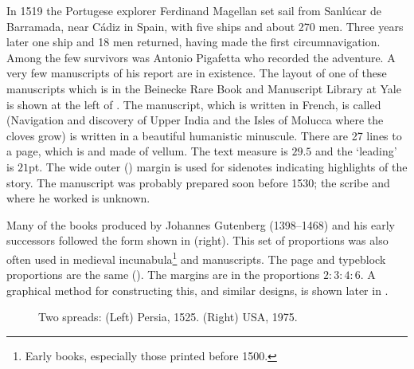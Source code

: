 \documentclass[10pt,a4paper,extrafontsizes]{memoir}
\begin{document}
\begin{paracol}{2}
\switchEng
    In 1519 the Portugese explorer Ferdinand Magellan set sail from 
Sanl\'{u}car de Barramada, near C\'{a}diz in Spain, 
with five ships and about 270 men.
Three years later one ship and 18 men returned, having made the first
circumnavigation. Among the few survivors was Antonio Pigafetta who recorded
the adventure. 
A very few manuscripts of his report are in existence.
The layout of one of these manuscripts which is in the Beinecke Rare
Book and Manuscript Library at Yale is shown at the left of .
The manuscript, which is written in French, is called 
 (Navigation and discovery
of Upper India and the Isles of Molucca where the cloves grow) is written
in a beautiful humanistic minuscule. 
There are 27 lines to a page, which
is  and made of vellum. The text measure is $29.5$
and the `leading' is $21$pt. The wide outer (\foredge) margin is used 
for sidenotes
indicating highlights of the story. The manuscript was probably prepared 
soon before 1530; the scribe and where he worked is unknown.

    Many of the books produced by Johannes Gutenberg
(1398--1468) and his early successors followed the form shown in
 (right). This set of proportions was also often used in
medieval incunabula\footnote{Early books, especially 
those printed before 1500.}  and manuscripts. The page and typeblock 
proportions are the same (). The margins are in the 
proportions $2 : 3 : 4 : 6$.
A graphical method for constructing this, and similar designs, is 
shown later in .
\end{paracol}

\begin{figure}
\centering
\begin{minipage}[b]{\pwlayi}
\end{minipage}
\hfill
\begin{minipage}[b]{\pwlayi}
\end{minipage}
\caption[Two spreads: Persia, 1525 and USA, 1975]%
        {Two spreads: (Left) Persia, 1525.
         (Right) USA, 1975.} \label{fb:10}
\end{figure}
\end{document}
